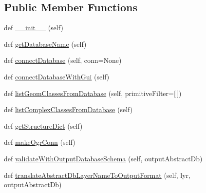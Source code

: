 \subsection*{Public Member Functions}
\begin{DoxyCompactItemize}
\item 
def \mbox{\hyperlink{class_dsg_tools_1_1_factories_1_1_db_factory_1_1spatialite_db_1_1_spatialite_db_ab504e65c1f5d7ad3acc3c7739f939cec}{\+\_\+\+\_\+init\+\_\+\+\_\+}} (self)
\item 
def \mbox{\hyperlink{class_dsg_tools_1_1_factories_1_1_db_factory_1_1spatialite_db_1_1_spatialite_db_a3cf37bff5d32a7dd524eef7d0dd6d272}{get\+Database\+Name}} (self)
\item 
def \mbox{\hyperlink{class_dsg_tools_1_1_factories_1_1_db_factory_1_1spatialite_db_1_1_spatialite_db_a681816e7af523d4799baea83afffec2b}{connect\+Database}} (self, conn=None)
\item 
def \mbox{\hyperlink{class_dsg_tools_1_1_factories_1_1_db_factory_1_1spatialite_db_1_1_spatialite_db_a8af5d99f30b1196ba398157b2e2d78dc}{connect\+Database\+With\+Gui}} (self)
\item 
def \mbox{\hyperlink{class_dsg_tools_1_1_factories_1_1_db_factory_1_1spatialite_db_1_1_spatialite_db_a8d2a6e18a5af7a635035c71695f4faf8}{list\+Geom\+Classes\+From\+Database}} (self, primitive\+Filter=\mbox{[}$\,$\mbox{]})
\item 
def \mbox{\hyperlink{class_dsg_tools_1_1_factories_1_1_db_factory_1_1spatialite_db_1_1_spatialite_db_a07ea8ea944ac40120fe9bb674d46106b}{list\+Complex\+Classes\+From\+Database}} (self)
\item 
def \mbox{\hyperlink{class_dsg_tools_1_1_factories_1_1_db_factory_1_1spatialite_db_1_1_spatialite_db_aac7bf6aaccd3329118bafb1b9ecd1742}{get\+Structure\+Dict}} (self)
\item 
def \mbox{\hyperlink{class_dsg_tools_1_1_factories_1_1_db_factory_1_1spatialite_db_1_1_spatialite_db_a90ac5680b7a302f0e6d99f21f7c48b40}{make\+Ogr\+Conn}} (self)
\item 
def \mbox{\hyperlink{class_dsg_tools_1_1_factories_1_1_db_factory_1_1spatialite_db_1_1_spatialite_db_ae6063c531bf964bc1ffb392c2324fa89}{validate\+With\+Output\+Database\+Schema}} (self, output\+Abstract\+Db)
\item 
def \mbox{\hyperlink{class_dsg_tools_1_1_factories_1_1_db_factory_1_1spatialite_db_1_1_spatialite_db_a573a18e4e871fa495d1c2ccff47bdfc3}{translate\+Abstract\+Db\+Layer\+Name\+To\+Output\+Format}} (self, lyr, output\+Abstract\+Db)
\item 

\end{DoxyCompactItemize}
